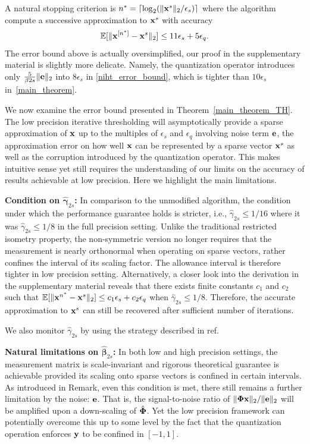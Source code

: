 \documentclass{article}
\begin{document}
A natural stopping criterion is $n^* = \lceil \log_2 (\|{\bf x}^s \|_2/\epsilon_s)\rceil$ where the algorithm compute a successive approximation to ${\bf x}^s$ with accuracy
\begin{equation}
    \mathbb{E}[\|{\bf x}^{[n^*]}-{\bf x}^s \|_2] \leq 11\epsilon_s + 5\epsilon_q.
\end{equation}
The error bound above is actually oversimplified, our proof in the supplementary material is slightly more delicate. Namely, the quantization operator introduces only $\frac{5}{\beta
{2s}} \|{\bf e} \|_2$ into $8\epsilon_s$ in \ref{niht_error_bound}, which is tighter than $10\epsilon_s$ in~\ref{main_theorem}.

We now examine the error bound presented in Theorem~\ref{main_theorem_TH}. The low precision iterative thresholding will asymptotically provide a sparse approximation of ${\bf x}$ up to the multiples of $\epsilon_s$ and $\epsilon_q$ involving noise term ${\bf e}$, the approximation error on how well ${\bf x}$ can be represented by a sparse vector ${\bf x}^s$ as well as the corruption introduced by the quantization operator. This makes intuitive sense yet still requires the understanding of our limits on the accuracy of results achievable at low precision. Here we highlight the main limitations.

{\bf Condition on $\hat{\boldsymbol{\gamma}}_{2s}$:} In comparison to the unmodified algorithm, the condition under which the performance guarantee holds is stricter, i.e., $\hat{\gamma}_{2s}\leq 1/16$ where it was $\hat{\gamma}_{2s}\leq 1/8$ in the full precision setting. Unlike the traditional restricted isometry property, the non-symmetric version no longer requires that the measurement is nearly orthonormal when operating on sparse vectors, rather confines the interval of its scaling factor. The allowance interval is therefore tighter in low precision setting. Alternatively, a closer look into the derivation in the supplementary material reveals that there exists finite constants $c_1$ and $c_2$ such that $\mathbb{E}[\|{\bf x}^{n^*}-{\bf x}^s \|_2] \leq c_1\epsilon_s + c_2\epsilon_q$ when $\hat{\gamma}_{2s}\leq 1/8$. Therefore, the accurate approximation to ${\bf x}^s$ can still be recovered after sufficient number of iterations.

We also monitor $\hat{\gamma}_{2s}$ by using the strategy described in ref.

{\bf Natural limitations on $\hat{\boldsymbol{\beta}}_{2s}$:} In both low and high precision settings, the measurement matrix is scale-invariant and rigorous theoretical guarantee is achievable provided its scaling onto sparse vectors is confined in certain intervals. As introduced in Remark, even this condition is met, there still remains a further limitation by the noise: ${\bf e}$. That is, the signal-to-noise ratio of $\|{\bf \Phi} {\bf x} \|_2/\|{\bf e} \|_2$ will be amplified upon a down-scaling of $\hat{\bf \Phi}$. Yet the low precision framework can potentially overcome this up to some level by the fact that the quantization operation enforces ${\bf y}$ to be confined in $[-1, 1]$.
\end{document}
